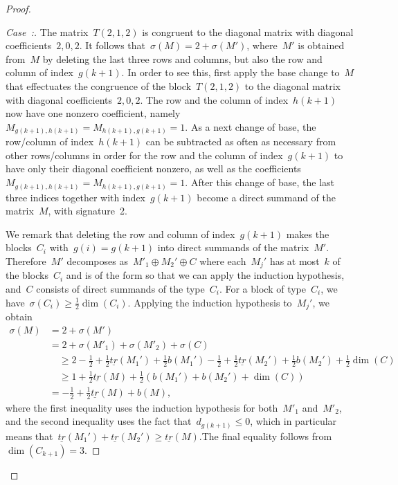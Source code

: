 \documentclass[10pt,a4paper]{amsart}
\numberwithin{equation}{section}
\newcounter{casecount}
\newenvironment{case}[1]{\refstepcounter{casecount}\begin{proof}[Case~\thecasecount:\;{#1}]}{\let\qed\relax\end{proof}}
\begin{document}
\begin{proof}
\begin{case}{{$C_{k+1} = T(2,1,2)$}}\label{casebis3}
The matrix~$T(2,1,2)$ is congruent to the diagonal matrix with diagonal coefficients~$2,0,2$. It follows that~$\sigma(M) = 2 + \sigma(M')$, where~$M'$ is obtained from~$M$ by deleting the last three rows and columns, but also the row and column of index~$g(k+1)$. In order to see this, first apply the base change to~$M$ that effectuates the congruence of the block~$T(2,1,2)$ to the diagonal matrix with diagonal coefficients~$2,0,2$. The row and the column of index~$h(k+1)$ now have one nonzero coefficient, namely~$M_{g(k+1),h(k+1)} = M_{h(k+1),g(k+1)} = 1$. As a next change of base, the row/column of index~$h(k+1)$ can be subtracted as often as necessary from other rows/columns in order for the row and the column of index~$g(k+1)$ to have only their diagonal coefficient nonzero, as well as the coefficients~$M_{g(k+1),h(k+1)} = M_{h(k+1),g(k+1)} = 1$. After this change of base, the last three indices together with index~$g(k+1)$ become a direct summand of the matrix~$M$, with signature~2.

We remark that deleting the row and column of index~$g(k+1)$ makes the blocks~$C_i$ with~$g(i) = g(k+1)$ into direct summands of the matrix~$M'$. Therefore~$M'$ decomposes as~$M'_1 \oplus M_2' \oplus C$ where each~$M_j'$ has at most~$k$ of the blocks~$C_i$ and is of the form so that we can apply the induction hypothesis, and~$C$ consists of direct summands of the type~$C_i$. For a block of type~$C_i$, we have~$\sigma(C_i) \ge \frac{1}{2}\dim(C_i)$. Applying the induction hypothesis to~$M_j'$, we obtain
\begin{align*}
\sigma(M) &= 2 + \sigma(M') \\
&= 2 + \sigma(M'_1) + \sigma(M'_2) + \sigma(C) \\
&\quad\ge 2 -\frac{1}{2} + \frac{1}{2}\underline{tr}(M_1')+ \frac{1}{2}b(M_1') -\frac{1}{2}+ \frac{1}{2}\underline{tr}(M_2')+\frac{1}{2}b(M_2') + \frac{1}{2}\dim(C) \\
&\quad\ge 1 + \frac{1}{2} \underline{tr}(M) + \frac{1}{2}\left(b(M_1') + b(M_2') + \dim(C)\right) \\
&= -\frac{1}{2} + \frac{1}{2} \underline{tr}(M) + b(M),
\end{align*}
where the first inequality uses the induction hypothesis for both~$M'_1$ and~$M'_2$, and the second inequality uses the fact that~$d_{g(k+1)}\le 0$, which in particular means that~$\underline{tr}(M_1') + \underline{tr}(M_2') \ge \underline{tr}(M)$.The final equality follows from~$\dim(C_{k+1}) = 3$.
\end{case}


\end{proof}
\end{document}

